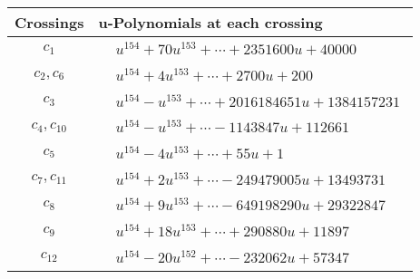 \documentclass[1p]{elsarticle_modified}
\theoremstyle{definition}
\begin{document}
\begin{tabular}{m{50pt}|m{274pt}}
Crossings & \hspace{64pt}u-Polynomials at each crossing \\
\hline $$\begin{aligned}c_{1}\end{aligned}$$&$\begin{aligned}
&u^{154}+70 u^{153}+\cdots+2351600 u+40000
\end{aligned}$\\
\hline $$\begin{aligned}c_{2},c_{6}\end{aligned}$$&$\begin{aligned}
&u^{154}+4 u^{153}+\cdots+2700 u+200
\end{aligned}$\\
\hline $$\begin{aligned}c_{3}\end{aligned}$$&$\begin{aligned}
&u^{154}- u^{153}+\cdots+2016184651 u+1384157231
\end{aligned}$\\
\hline $$\begin{aligned}c_{4},c_{10}\end{aligned}$$&$\begin{aligned}
&u^{154}- u^{153}+\cdots-1143847 u+112661
\end{aligned}$\\
\hline $$\begin{aligned}c_{5}\end{aligned}$$&$\begin{aligned}
&u^{154}-4 u^{153}+\cdots+55 u+1
\end{aligned}$\\
\hline $$\begin{aligned}c_{7},c_{11}\end{aligned}$$&$\begin{aligned}
&u^{154}+2 u^{153}+\cdots-249479005 u+13493731
\end{aligned}$\\
\hline $$\begin{aligned}c_{8}\end{aligned}$$&$\begin{aligned}
&u^{154}+9 u^{153}+\cdots-649198290 u+29322847
\end{aligned}$\\
\hline $$\begin{aligned}c_{9}\end{aligned}$$&$\begin{aligned}
&u^{154}+18 u^{153}+\cdots+290880 u+11897
\end{aligned}$\\
\hline $$\begin{aligned}c_{12}\end{aligned}$$&$\begin{aligned}
&u^{154}-20 u^{152}+\cdots-232062 u+57347
\end{aligned}$\\
\hline
\end{tabular}\\~\\
\end{document}
